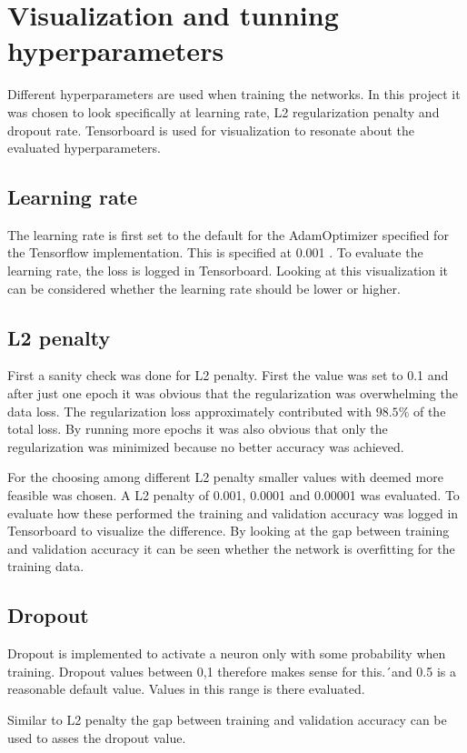 \section{Visualization and tunning hyperparameters}
Different hyperparameters are used when training the networks. In this project it was chosen to look specifically at learning rate, L2 regularization penalty and dropout rate. Tensorboard is used for visualization to resonate about the evaluated hyperparameters.

\subsection{Learning rate}
The learning rate is first set to the default for the AdamOptimizer specified for the Tensorflow implementation. This is specified at 0.001 . To evaluate the learning rate, the loss is logged in Tensorboard. Looking at this visualization it can be considered whether the learning rate should be lower or higher.


\subsection{L2 penalty}
First a sanity check was done for L2 penalty. First the value was set to 0.1 and after just one epoch it was obvious that the regularization was overwhelming the data loss. The regularization loss approximately contributed with $98.5\%$ of the total loss. By running more epochs it was also obvious that only the regularization was minimized because no better accuracy was achieved.

For the choosing among different L2 penalty smaller values with deemed more feasible was chosen. A L2 penalty of 0.001, 0.0001 and 0.00001 was evaluated. To evaluate how these performed the training and validation accuracy was logged in Tensorboard to visualize the difference. By looking at the gap between training and validation accuracy it can be seen whether the network is overfitting for the training data.

\subsection{Dropout}
Dropout is implemented to activate a neuron only with some probability when training. Dropout values between 0,1 therefore makes sense for this.´and 0.5 is a reasonable default value. Values in this range is there evaluated.

Similar to L2 penalty the gap between training and validation accuracy can be used to asses the dropout value. 





